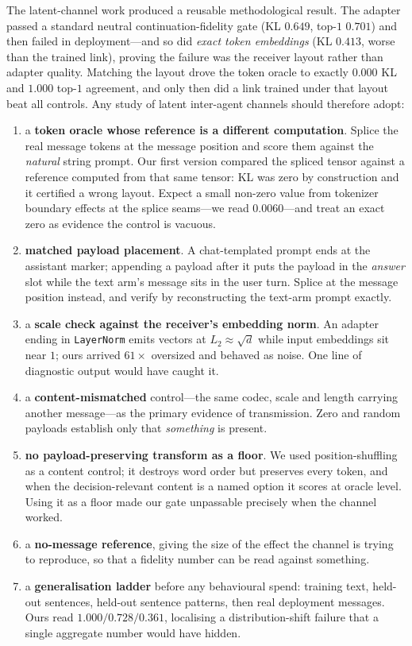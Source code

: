 The latent-channel work produced a reusable methodological result. The adapter passed
a standard neutral continuation-fidelity gate (KL $0.649$, top-$1$ $0.701$) and then
failed in deployment---and so did \emph{exact token embeddings} (KL $0.413$, worse
than the trained link), proving the failure was the receiver layout rather than
adapter quality. Matching the layout drove the token oracle to exactly $0.000$ KL and
$1.000$ top-$1$ agreement, and only then did a link trained under that layout beat all
controls. Any study of latent inter-agent channels should therefore adopt:
\begin{enumerate}[leftmargin=1.4em,itemsep=1pt,topsep=2pt]
\item a \textbf{token oracle whose reference is a different computation}. Splice the
real message tokens at the message position and score them against the \emph{natural}
string prompt. Our first version compared the spliced tensor against a reference
computed from that same tensor: KL was zero by construction and it certified a wrong
layout. Expect a small non-zero value from tokenizer boundary effects at the splice
seams---we read $0.0060$---and treat an exact zero as evidence the control is vacuous.
\item \textbf{matched payload placement}. A chat-templated prompt ends at the
assistant marker; appending a payload after it puts the payload in the \emph{answer}
slot while the text arm's message sits in the user turn. Splice at the message
position instead, and verify by reconstructing the text-arm prompt exactly.
\item a \textbf{scale check against the receiver's embedding norm}. An adapter ending
in \texttt{LayerNorm} emits vectors at $L_2\approx\sqrt{d}$ while input embeddings sit
near $1$; ours arrived $61\times$ oversized and behaved as noise. One line of
diagnostic output would have caught it.
\item a \textbf{content-mismatched} control---the same codec, scale and length carrying
another message---as the primary evidence of transmission. Zero and random payloads
establish only that \emph{something} is present.
\item \textbf{no payload-preserving transform as a floor}. We used position-shuffling
as a content control; it destroys word order but preserves every token, and when the
decision-relevant content is a named option it scores at oracle level. Using it as a
floor made our gate unpassable precisely when the channel worked.
\item a \textbf{no-message reference}, giving the size of the effect the channel is
trying to reproduce, so that a fidelity number can be read against something.
\item a \textbf{generalisation ladder} before any behavioural spend: training text,
held-out sentences, held-out sentence patterns, then real deployment messages. Ours
read $1.000/0.728/0.361$, localising a distribution-shift failure that a single
aggregate number would have hidden.
\end{enumerate}

